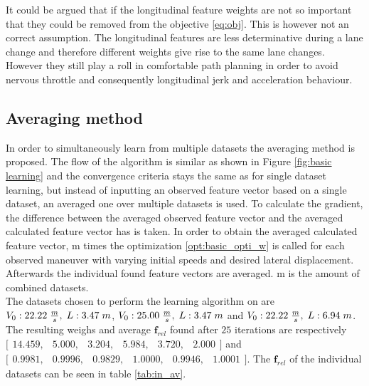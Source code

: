 It could be argued that if the longitudinal feature weights are not so important that they could be removed from the objective \ref{eq:obj}. This is however not an correct assumption. The longitudinal features are less determinative during a lane change and therefore different weights give rise to the same lane changes. However they still play a roll in comfortable path planning in order to avoid nervous throttle and consequently longitudinal jerk and acceleration behaviour. 


\subsection{Averaging method}\label{s:averaging_method}
In order to simultaneously learn from multiple datasets the averaging method is proposed. \cite{Kuderer2015a} The flow of the algorithm is similar as shown in Figure \ref{fig:basic learning} and the convergence criteria stays the same as for single dataset learning, but instead of inputting an observed feature vector based on a single dataset, an averaged one over multiple datasets is used.
To calculate the gradient, the difference between the averaged observed feature vector and the averaged calculated feature vector has is taken. In order to obtain the averaged calculated feature vector, m times the optimization \ref{opt:basic_opti_w} is called for each observed maneuver with varying initial speeds and desired lateral displacement. Afterwards the individual found feature vectors are averaged. m is the amount of combined datasets.\\
 

The datasets chosen to perform the learning algorithm on are $V_0:22.22\hspace{1mm}\frac{m}{s},\hspace{1mm} L:3.47\hspace{1mm}m$, $V_0:25.00\hspace{1mm}\frac{m}{s},\hspace{1mm} L:3.47\hspace{1mm}m$ and $V_0:22.22\hspace{1mm}\frac{m}{s},\hspace{1mm} L:6.94\hspace{1mm}m$. The resulting weighs and average $\bm{f}_{rel}$ found after $25$ iterations are respectively $\bigl[ \begin{smallmatrix} 14.459,&5.000,&3.204,&5.984,&3.720,&2.000\end{smallmatrix}\bigr]$ and $\bigl[ \begin{smallmatrix} 0.9981,&0.9996,&0.9829,&1.0000,&0.9946,&1.0001\end{smallmatrix}\bigr]$. The $\bm{f}_{rel}$ of the individual datasets can be seen in table \ref{tab:in_av}.
 
